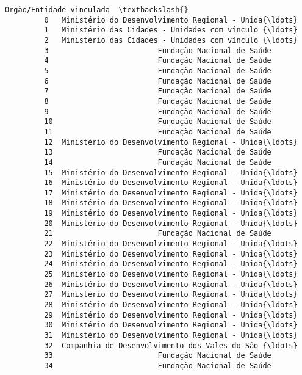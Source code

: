 \documentclass[11pt]{article}
\begin{document}
\begin{Verbatim}[commandchars=\\\{\}]
                                      Órgão/Entidade vinculada  \textbackslash{}
         0   Ministério do Desenvolvimento Regional - Unida{\ldots}   
         1   Ministério das Cidades - Unidades com vínculo {\ldots}   
         2   Ministério das Cidades - Unidades com vínculo {\ldots}   
         3                         Fundação Nacional de Saúde    
         4                         Fundação Nacional de Saúde    
         5                         Fundação Nacional de Saúde    
         6                         Fundação Nacional de Saúde    
         7                         Fundação Nacional de Saúde    
         8                         Fundação Nacional de Saúde    
         9                         Fundação Nacional de Saúde    
         10                        Fundação Nacional de Saúde    
         11                        Fundação Nacional de Saúde    
         12  Ministério do Desenvolvimento Regional - Unida{\ldots}   
         13                        Fundação Nacional de Saúde    
         14                        Fundação Nacional de Saúde    
         15  Ministério do Desenvolvimento Regional - Unida{\ldots}   
         16  Ministério do Desenvolvimento Regional - Unida{\ldots}   
         17  Ministério do Desenvolvimento Regional - Unida{\ldots}   
         18  Ministério do Desenvolvimento Regional - Unida{\ldots}   
         19  Ministério do Desenvolvimento Regional - Unida{\ldots}   
         20  Ministério do Desenvolvimento Regional - Unida{\ldots}   
         21                        Fundação Nacional de Saúde    
         22  Ministério do Desenvolvimento Regional - Unida{\ldots}   
         23  Ministério do Desenvolvimento Regional - Unida{\ldots}   
         24  Ministério do Desenvolvimento Regional - Unida{\ldots}   
         25  Ministério do Desenvolvimento Regional - Unida{\ldots}   
         26  Ministério do Desenvolvimento Regional - Unida{\ldots}   
         27  Ministério do Desenvolvimento Regional - Unida{\ldots}   
         28  Ministério do Desenvolvimento Regional - Unida{\ldots}   
         29  Ministério do Desenvolvimento Regional - Unida{\ldots}   
         30  Ministério do Desenvolvimento Regional - Unida{\ldots}   
         31  Ministério do Desenvolvimento Regional - Unida{\ldots}   
         32  Companhia de Desenvolvimento dos Vales do São {\ldots}   
         33                        Fundação Nacional de Saúde    
         34                        Fundação Nacional de Saúde    
         

\end{Verbatim}
\end{document}
